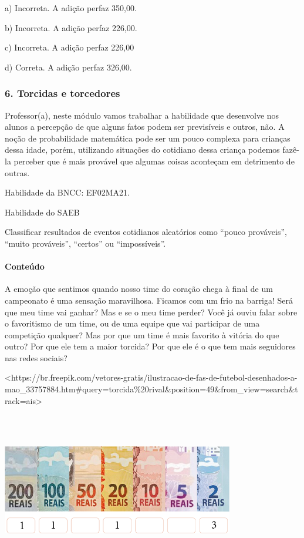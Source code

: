 a) Incorreta. A adição perfaz 350,00.

b) Incorreta. A adição perfaz 226,00.

c) Incorreta. A adição perfaz 226,00

d) Correta. A adição perfaz 326,00.

\subsubsection{6. Torcidas e torcedores}\label{muxf3dulo-6}

Professor(a), neste módulo vamos trabalhar a habilidade que desenvolve nos alunos a percepção de que alguns fatos podem ser previsíveis e
outros, não. A noção de probabilidade matemática pode ser um pouco
complexa para crianças dessa idade, porém, utilizando situações do
cotidiano dessa criança podemos fazê-la perceber que é mais provável que
algumas coisas aconteçam em detrimento de outras. 

Habilidade da BNCC: EF02MA21.

Habilidade do SAEB

Classificar resultados de eventos cotidianos aleatórios como ``pouco
prováveis'', ``muito prováveis'', ``certos'' ou ``impossíveis''.

\paragraph{Conteúdo}\label{conteuxfado-5}

A emoção que sentimos quando nosso time do coração chega à final de um
campeonato é uma sensação maravilhosa. Ficamos com um frio na barriga!
Será que meu time vai ganhar? Mas e se o meu time perder? Você já ouviu
falar sobre o favoritismo de um time, ou de uma equipe que vai
participar de uma competição qualquer? Mas por que um
time é mais favorito à vitória do que outro? Por que ele tem a maior
torcida? Por que ele é o que tem mais seguidores nas redes sociais?

\textless{}https://br.freepik.com/vetores-gratis/ilustracao-de-fas-de-futebol-desenhados-a-mao\_33757884.htm\#query=torcida\%20rival\&position=49\&from\_view=search\&track=ais\textgreater{}

\includegraphics[width=3.98958in,height=2.65972in]{media/image83.png}

